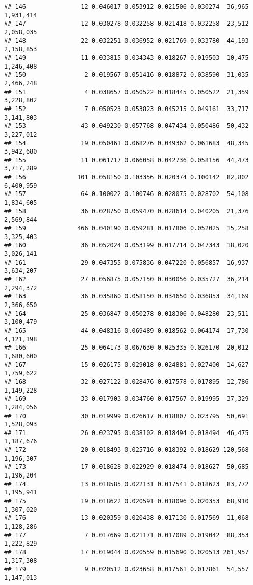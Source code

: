 \documentclass[]{article}
\begin{document}
\begin{verbatim}
## 146               12 0.046017 0.053912 0.021506 0.030274  36,965 1,931,414
## 147               12 0.030278 0.032258 0.021418 0.032258  23,512 2,058,035
## 148               22 0.032251 0.036952 0.021769 0.033780  44,193 2,158,853
## 149               11 0.033815 0.034343 0.018267 0.019503  10,475 1,246,408
## 150                2 0.019567 0.051416 0.018872 0.038590  31,035 2,466,248
## 151                4 0.038657 0.050522 0.018445 0.050522  21,359 3,228,802
## 152                7 0.050523 0.053823 0.045215 0.049161  33,717 3,141,803
## 153               43 0.049230 0.057768 0.047434 0.050486  50,432 3,227,012
## 154               19 0.050461 0.068276 0.049362 0.061683  48,345 3,942,680
## 155               11 0.061717 0.066058 0.042736 0.058156  44,473 3,717,289
## 156              101 0.058150 0.103356 0.020374 0.100142  82,802 6,400,959
## 157               64 0.100022 0.100746 0.028075 0.028702  54,108 1,834,605
## 158               36 0.028750 0.059470 0.028614 0.040205  21,376 2,569,844
## 159              466 0.040190 0.059281 0.017806 0.052025  15,258 3,325,403
## 160               36 0.052024 0.053199 0.017714 0.047343  18,020 3,026,141
## 161               29 0.047355 0.075836 0.047220 0.056857  16,937 3,634,207
## 162               27 0.056875 0.057150 0.030056 0.035727  36,214 2,294,372
## 163               36 0.035860 0.058150 0.034650 0.036853  34,169 2,366,650
## 164               25 0.036847 0.050278 0.018306 0.048280  23,511 3,100,479
## 165               44 0.048316 0.069489 0.018562 0.064174  17,730 4,121,198
## 166               25 0.064173 0.067630 0.025335 0.026170  20,012 1,680,600
## 167               15 0.026175 0.029018 0.024881 0.027400  14,627 1,759,622
## 168               32 0.027122 0.028476 0.017578 0.017895  12,786 1,149,228
## 169               33 0.017903 0.034760 0.017567 0.019995  37,329 1,284,056
## 170               30 0.019999 0.026617 0.018807 0.023795  50,691 1,528,093
## 171               26 0.023795 0.038102 0.018494 0.018494  46,475 1,187,676
## 172               20 0.018493 0.025716 0.018392 0.018629 120,568 1,196,307
## 173               17 0.018628 0.022929 0.018474 0.018627  50,685 1,196,204
## 174               13 0.018585 0.022131 0.017541 0.018623  83,772 1,195,941
## 175               19 0.018622 0.020591 0.018096 0.020353  68,910 1,307,020
## 176               13 0.020359 0.020438 0.017130 0.017569  11,068 1,128,286
## 177                7 0.017669 0.021171 0.017089 0.019042  88,353 1,222,829
## 178               17 0.019044 0.020559 0.015690 0.020513 261,957 1,317,308
## 179                9 0.020512 0.023658 0.017561 0.017861  54,557 1,147,013

\end{verbatim}
\end{document}
